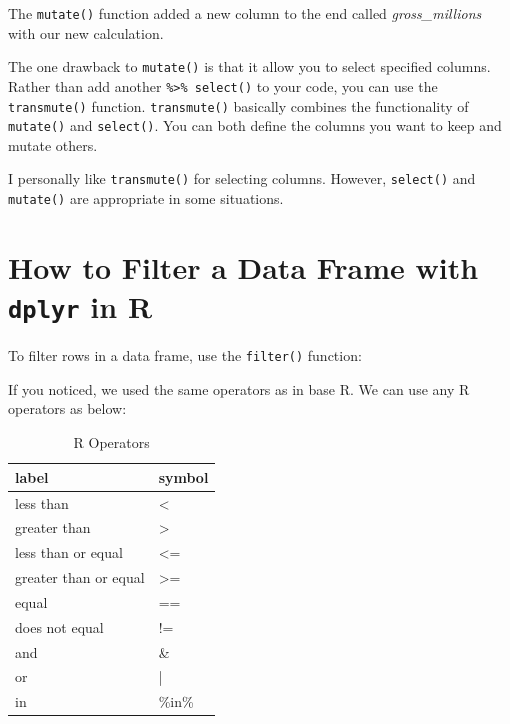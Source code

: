 \documentclass[
]{book}
\newenvironment{Shaded}{\begin{snugshade}}{\end{snugshade}}
\newcommand{\DataTypeTok}[1]{\textcolor[rgb]{0.13,0.29,0.53}{#1}}
\newcommand{\DecValTok}[1]{\textcolor[rgb]{0.00,0.00,0.81}{#1}}
\newcommand{\KeywordTok}[1]{\textcolor[rgb]{0.13,0.29,0.53}{\textbf{#1}}}
\newcommand{\NormalTok}[1]{#1}
\newcommand{\OperatorTok}[1]{\textcolor[rgb]{0.81,0.36,0.00}{\textbf{#1}}}
\newcommand{\StringTok}[1]{\textcolor[rgb]{0.31,0.60,0.02}{#1}}
\begin{document}
\begin{center}
The \texttt{mutate()} function added a new column to the end called \emph{gross\_millions} with our new calculation.

The one drawback to \texttt{mutate()} is that it allow you to select specified columns. Rather than add another \texttt{\%\textgreater{}\%\ select()} to your code, you can use the \texttt{transmute()} function. \texttt{transmute()} basically combines the functionality of \texttt{mutate()} and \texttt{select()}. You can both define the columns you want to keep and mutate others.

\begin{Shaded}
\end{Shaded}

I personally like \texttt{transmute()} for selecting columns. However, \texttt{select()} and \texttt{mutate()} are appropriate in some situations.

\hypertarget{how-to-filter-a-data-frame-with-dplyr-in-r}{%
\section{\texorpdfstring{How to Filter a Data Frame with \texttt{dplyr} in R}{How to Filter a Data Frame with dplyr in R}}\label{how-to-filter-a-data-frame-with-dplyr-in-r}}

To filter rows in a data frame, use the \texttt{filter()} function:

\begin{Shaded}
\end{Shaded}

If you noticed, we used the same operators as in base R. We can use any R operators as below:

\begin{table}

\caption{\label{tab:dplyr-fig8}R Operators}
\centering
\begin{tabular}[t]{ll}
\toprule
label & symbol\\
\midrule
less than & <\\
greater than & >\\
less than or equal & <=\\
greater than or equal & >=\\
equal & ==\\
\addlinespace
does not equal & !=\\
and & \&\\
or & |\\
in & \%in\%\\
\bottomrule
\end{tabular}
\end{table}


\end{center}
\end{document}
